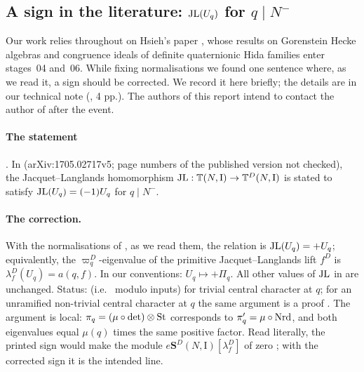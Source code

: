 \subsection{A sign in the literature: \texorpdfstring{$\mathrm{JL}(U_q)$}{JL(U\_q)} for \texorpdfstring{$q\mid N^-$}{q | N-}}\label{ss:hsieh}\label{rpt:rem:s05-hsieh}
Our work relies throughout on Hsieh's paper \cite{Hs}, whose results on Gorenstein Hecke algebras and congruence ideals of
definite quaternionic Hida families enter stages~04 and~06. While fixing normalisations we found one sentence where, as
we read it, a sign should be corrected. We record it here briefly; the details are in our technical note \cite{LLhsieh}
(, 4 pp.). The authors of this report intend to contact the author of \cite{Hs} after the event.

\paragraph{The statement} \stcited. In \cite[\S4.5, p.~34]{Hs} (arXiv:1705.02717v5; page numbers of the published version
not checked), the Jacquet--Langlands homomorphism $\mathrm{JL}:\mathbb{T}(N,\mathrm{I})\to\mathbb{T}^D(N,\mathrm{I})$ is stated to satisfy $\mathrm{JL}(U_q)=(-1)U_q$ for
$q\mid N^-$.

\paragraph{The correction.} With the normalisations of \cite{Hs}, as we read them, the relation is $\mathrm{JL}(U_q)=+U_q$; equivalently,
the $\varpi^D_q$-eigenvalue of the primitive Jacquet--Langlands lift $f^D$ is $\lambda^D_f(U_q)=a(q,f)$. In our conventions:
$U_q\mapsto+\Pi_q$. All other values of $\mathrm{JL}$ in \cite[p.~34]{Hs} are unchanged. Status: \stpmc{} (i.e.\ \stproved{} modulo
\stcited{} inputs) for trivial central character at $q$; for an unramified non-trivial central character at $q$ the same argument
is a proof \stsketch{} \cite[Prop.~2.1]{LLhsieh}. The argument is local: $\pi_q=(\mu\circ\det)\otimes\mathrm{St}$ corresponds to
$\pi'_q=\mu\circ\mathrm{Nrd}$, and both eigenvalues equal $\mu(q)$ times the same positive factor. Read literally, the printed sign would
make the module $e\mathbf{S}^D(N,\mathrm{I})[\lambda^D_f]$ of \cite[Thm~4.5]{Hs} zero \cite[Lemma~2.3]{LLhsieh}; with the corrected
sign it is the intended line.

